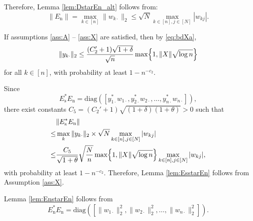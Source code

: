 \documentclass[11pt,journal]{IEEEtran}
\newcommand{\rms}{\mathrm{s}}
\newcommand{\rmn}{\mathrm{n}}
\newcommand{\norm}[1]{\|{#1}\|}
\newcommand{\diag}{\mathrm{diag}}
\begin{document}
\begin{IEEEproof}
Therefore, Lemma \ref{lem:DstarEn_alt} follows from: 
\[
\norm{E_\rmn} = \max_{k \in [n]} \norm{w_{k\cdot}}_2 \leq \sqrt{N}\max_{k\in[n],j\in[N]}|w_{kj}|.
\]

\end{IEEEproof}







\begin{IEEEproof}
If assumptions \ref{ass:A} -- \ref{ass:X} are satisfied, then by \eqref{eq:bdXa}, 
\[
\norm{y_{k\cdot}}_2 \leq \frac{(C_2' + 1)\sqrt{1+\delta}}{\sqrt{n}} \max\Bigl\{1, \norm{X}\sqrt{\log n} \Bigr\}
\]
for all $k\in[n]$, with probability at least $1-n^{-c_2}$.

Since
\[
E_\rms^*E_\rmn = \diag([y_{1\cdot}^*w_{1\cdot},y_{2\cdot}^*w_{2\cdot},\dots,y_{n\cdot}^*w_{n\cdot}]),
\]
there exist constants $C_5 = (C_2' + 1)\sqrt{(1+\delta)(1+\theta)} > 0$ such that
\begin{align*}
& \norm{ E_\rms^*E_\rmn } \\
\leq & \max_k\norm{y_{k\cdot}}_2 \times \sqrt{N}\max_{k\in[n], j\in[N]}|w_{kj}| \\
\leq & \frac{C_5}{\sqrt{1+\theta}}\sqrt{\frac{N}{n}} \max\Bigl\{1, \norm{X}\sqrt{\log n} \Bigr\} \max_{k\in[n], j\in[N]}|w_{kj}|,
\end{align*}
with probability at least $1-n^{-c_2}$. Therefore, Lemma \ref{lem:EsstarEn} follows from Assumption \ref{ass:X}.
\end{IEEEproof}




\begin{IEEEproof}
Lemma \ref{lem:EnstarEn} follows from
\[
E_\rmn^*E_\rmn = \diag([\norm{w_{1\cdot}}_2^2,\norm{w_{2\cdot}}_2^2,\dots, \norm{w_{n\cdot}}_2^2]).
\]
\end{IEEEproof}




\end{document}
